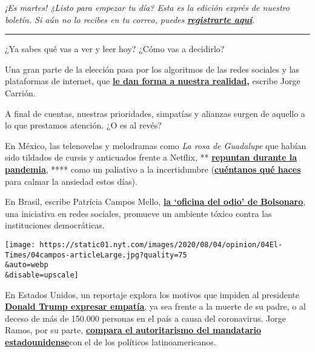 \emph{¡Es martes! ¿Listo para empezar tu día? Esta es la edición exprés
de nuestro boletín. Si aún no lo recibes en tu correo, puedes}
\textbf{\href{https://www.nytimes.com/newsletters/el-times}{\emph{registrarte
aquí}}}\emph{.}

\begin{center}\rule{0.5\linewidth}{\linethickness}\end{center}

¿Ya sabes qué vas a ver y leer hoy? ¿Cómo vas a decidirlo?

Una gran parte de la elección pasa por los algoritmos de las redes
sociales y las plataformas de internet, que
\textbf{\href{https://www.nytimes.com/es/2020/08/02/espanol/opinion/facebook-amazon-instagram.html}{le
dan forma a nuestra realidad},} escribe Jorge Carrión.

A final de cuentas, nuestras prioridades, simpatías y alianzas surgen de
aquello a lo que prestamos atención. ¿O es al revés?

En México, las telenovelas y melodramas como \emph{La rosa de Guadalupe}
que habían sido tildados de cursis y anticuados frente a Netflix, **
\textbf{\href{https://www.nytimes.com/es/2020/08/02/espanol/america-latina/televisa-rosa-de-guadalupe-netflix.html}{repuntan
durante la pandemia}}, **** como un paliativo a la incertidumbre
(\textbf{\href{https://www.nytimes.com/es/2020/08/02/espanol/america-latina/televisa-rosa-de-guadalupe-netflix.html\#commentsContainer}{cuéntanos
qué haces}} para calmar la ansiedad estos días).

En Brasil, escribe Patrícia Campos Mello,
\textbf{\href{https://www.nytimes.com/es/2020/08/04/espanol/opinion/bolsonaro-oficina-odio-brasil.html}{la
`oficina del odio' de Bolsonaro}}, una iniciativa en redes sociales,
promueve un ambiente tóxico contra las instituciones democráticas.

\texttt{[image: https://static01.nyt.com/images/2020/08/04/opinion/04El-Times/04campos-articleLarge.jpg?quality=75\\\&auto=webp\\\&disable=upscale]}

En Estados Unidos, un reportaje explora los motivos que impiden al
presidente
\textbf{\href{https://www.nytimes.com/es/2020/07/31/espanol/estados-unidos/fred-trump-donald-trump.html}{Donald
Trump expresar
empatía}}\href{https://www.nytimes.com/es/2020/07/31/espanol/estados-unidos/fred-trump-donald-trump.html}{,}
ya sea frente a la muerte de su padre, o al deceso de más de 150.000
personas en el país a causa del coronavirus. Jorge Ramos, por su parte,
\textbf{\href{https://www.nytimes.com/es/2020/08/01/espanol/opinion/trump-autoritarismo.html}{compara
el autoritarismo del mandatario
estadounidense}}\href{https://www.nytimes.com/es/2020/08/01/espanol/opinion/trump-autoritarismo.html}{}con
el de los políticos latinoamericanos.

